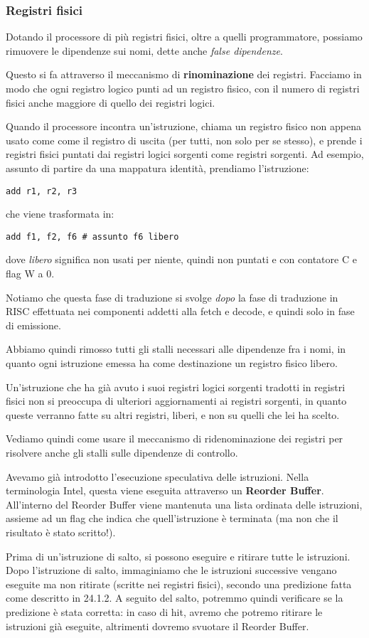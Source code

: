 \documentclass[a4paper,11pt]{article}
\begin{document}
\subsubsection{Registri fisici}
Dotando il processore di più registri fisici, oltre a quelli programmatore, possiamo rimuovere le dipendenze sui nomi, dette anche \textit{false dipendenze}. 

Questo si fa attraverso il meccanismo di \textbf{rinominazione} dei registri.
Facciamo in modo che ogni registro logico punti ad un registro fisico, con il numero di registri fisici anche maggiore di quello dei registri logici.

Quando il processore incontra un'istruzione, chiama un registro fisico non appena usato come come il registro di uscita (per tutti, non solo per se stesso), e prende i registri fisici puntati dai registri logici sorgenti come registri sorgenti.
Ad esempio, assunto di partire da una mappatura identità, prendiamo l'istruzione:
\begin{lstlisting}	
add r1, r2, r3
\end{lstlisting}
che viene trasformata in:
\begin{lstlisting}	
add f1, f2, f6 # assunto f6 libero
\end{lstlisting}
dove \textit{libero} significa non usati per niente, quindi non puntati e con contatore C e flag W a 0.

Notiamo che questa fase di traduzione si svolge \textit{dopo} la fase di traduzione in RISC effettuata nei componenti addetti alla fetch e decode, e quindi solo in fase di emissione.

Abbiamo quindi rimosso tutti gli stalli necessari alle dipendenze fra i nomi, in quanto ogni istruzione emessa ha come destinazione un registro fisico libero.

Un'istruzione che ha già avuto i suoi registri logici sorgenti tradotti in registri fisici non si preoccupa di ulteriori aggiornamenti ai registri sorgenti, in quanto queste verranno fatte su altri registri, liberi, e non su quelli che lei ha scelto.

\par \medskip

Vediamo quindi come usare il meccanismo di ridenominazione dei registri per risolvere anche gli stalli sulle dipendenze di controllo.

Avevamo già introdotto l'esecuzione speculativa delle istruzioni.
Nella terminologia Intel, questa viene eseguita attraverso un \textbf{Reorder Buffer}.
All'interno del Reorder Buffer viene mantenuta una lista ordinata delle istruzioni, assieme ad un flag che indica che quell'istruzione è terminata (ma non che il risultato è stato scritto!).

Prima di un'istruzione di salto, si possono eseguire e ritirare tutte le istruzioni.
Dopo l'istruzione di salto, immaginiamo che le istruzioni successive vengano eseguite ma non ritirate (scritte nei registri fisici), secondo una predizione fatta come descritto in 24.1.2.
A seguito del salto, potremmo quindi verificare se la predizione è stata corretta: in caso di hit, avremo che potremo ritirare le istruzioni già eseguite, altrimenti dovremo svuotare il Reorder Buffer.
\end{document}
